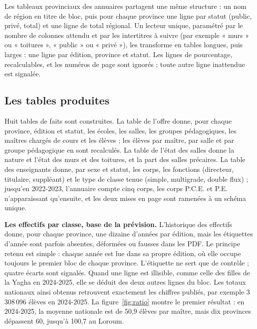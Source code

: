 \documentclass{article}
\begin{document}
Les tableaux provinciaux des annuaires partagent une même structure : un nom de région en titre de bloc, puis pour chaque province une ligne par statut (public, privé, total) et une ligne de total régional. Un lecteur unique, paramétré par le nombre de colonnes attendu et par les intertitres à suivre (par exemple « murs » ou « toitures », « public » ou « privé »), les transforme en tables longues, puis larges : une ligne par édition, province et statut. Les lignes de pourcentage, recalculables, et les numéros de page sont ignorés ; toute autre ligne inattendue est signalée.

\subsection{Les tables produites}

Huit tables de faits sont construites. La table de l'offre donne, pour chaque province, édition et statut, les écoles, les salles, les groupes pédagogiques, les maîtres chargés de cours et les élèves ; les élèves par maître, par salle et par groupe pédagogique en sont recalculés. La table de l'état des salles donne la nature et l'état des murs et des toitures, et la part des salles précaires. La table des enseignants donne, par sexe et statut, les corps, les fonctions (directeur, titulaire, suppléant) et le type de classe tenue (simple, multigrade, double flux) ; jusqu'en 2022-2023, l'annuaire compte cinq corps, les corps P.C.E. et P.E. n'apparaissant qu'ensuite, et les deux mises en page sont ramenées à un schéma unique.

\textbf{Les effectifs par classe, base de la prévision.} L'historique des effectifs donne, pour chaque province, une dizaine d'années par édition, mais les étiquettes d'année sont parfois absentes, déformées ou fausses dans les PDF. Le principe retenu est simple : chaque année est lue dans sa propre édition, où elle occupe toujours le premier bloc de chaque province. L'étiquette ne sert que de contrôle ; quatre écarts sont signalés. Quand une ligne est illisible, comme celle des filles de la Yagha en 2024-2025, elle se déduit des deux autres lignes du bloc. Les totaux nationaux ainsi obtenus retrouvent exactement les chiffres publiés, par exemple 3\,308\,096 élèves en 2024-2025. La figure~\ref{fig:ratio} montre le premier résultat : en 2024-2025, la moyenne nationale est de 50,9 élèves par maître, mais dix provinces dépassent 60, jusqu'à 100,7 au Loroum.
\end{document}
